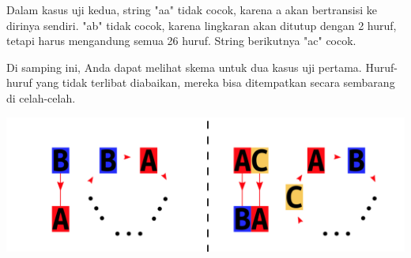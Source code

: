 \documentclass{article}
\begin{document}
Dalam kasus uji kedua, string "aa" tidak cocok, karena a akan bertransisi ke dirinya sendiri. "ab" tidak cocok, karena lingkaran akan ditutup dengan 2 huruf, tetapi harus mengandung semua 26 huruf. String berikutnya "ac" cocok.

\begin{minipage}{0.5\textwidth}
  Di samping ini, Anda dapat melihat skema untuk dua kasus uji pertama. Huruf-huruf yang tidak terlibat diabaikan, mereka bisa ditempatkan secara sembarang di celah-celah.
\end{minipage}
\begin{minipage}{0.5\textwidth}
  \includegraphics[width=\linewidth]{gambar_penjelasan.png}
\end{minipage}%
\end{document}
